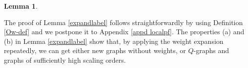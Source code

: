 \documentclass{article}
\newcommand{\1}{\mathds{1}}
\numberwithin{equation}{section}
\newcommand{\ord}{{\rm{ord}}}
\newcommand{\be}{\begin{equation}}
\newcommand{\ee}{\end{equation}}
\renewcommand{\cal}{\mathcal}
\renewcommand{\geq}{\geqslant}
\renewcommand{\ge}{\geq}
\theoremstyle{plain} %
\newtheorem{lemma}[theorem]{Lemma}
\theoremstyle{remark}
\newcommand{\cor}{\color{red}}
\newcommand{\hty}[1]{{\cor (ht: #1) }}
\begin{document}
\begin{lemma}
%
%
  \end{lemma}
 
 The proof of Lemma \ref{expandlabel} follows straightforwardly by using Definition \ref{Ow-def} and we postpone it to Appendix \ref{appd localpf}. The properties (a) and (b) in Lemma \ref{expandlabel}  show that, by applying the weight expansion repeatedly, we can get either new graphs without weights, or $Q$-graphs and graphs of sufficiently high scaling orders.
\end{document}

